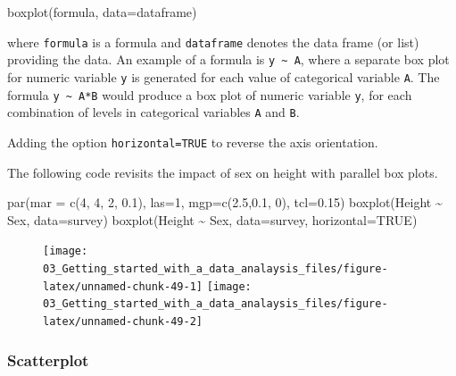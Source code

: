 \documentclass[
]{book}
\newenvironment{Shaded}{\begin{snugshade}}{\end{snugshade}}
\newcommand{\AttributeTok}[1]{\textcolor[rgb]{0.77,0.63,0.00}{#1}}
\newcommand{\ConstantTok}[1]{\textcolor[rgb]{0.00,0.00,0.00}{#1}}
\newcommand{\DecValTok}[1]{\textcolor[rgb]{0.00,0.00,0.81}{#1}}
\newcommand{\FloatTok}[1]{\textcolor[rgb]{0.00,0.00,0.81}{#1}}
\newcommand{\FunctionTok}[1]{\textcolor[rgb]{0.00,0.00,0.00}{#1}}
\newcommand{\NormalTok}[1]{#1}
\newcommand{\SpecialCharTok}[1]{\textcolor[rgb]{0.00,0.00,0.00}{#1}}
\begin{document}
\begin{Shaded}
\begin{Highlighting}[]
\FunctionTok{boxplot}\NormalTok{(formula, }\AttributeTok{data=}\NormalTok{dataframe)}
\end{Highlighting}
\end{Shaded}

where \texttt{formula} is a formula and \texttt{dataframe} denotes the data frame (or list) providing the data. An example of a formula is \texttt{y\ \textasciitilde{}\ A}, where a separate box plot for numeric variable \texttt{y} is generated for each value of categorical variable \texttt{A}. The formula \texttt{y\ \textasciitilde{}\ A*B} would produce a box plot of numeric variable \texttt{y}, for each combination of levels in categorical variables \texttt{A} and \texttt{B}.

Adding the option \texttt{horizontal=TRUE} to reverse the axis orientation.

The following code revisits the impact of sex on height with parallel box plots.

\begin{Shaded}
\begin{Highlighting}[]
\FunctionTok{par}\NormalTok{(}\AttributeTok{mar =} \FunctionTok{c}\NormalTok{(}\DecValTok{4}\NormalTok{, }\DecValTok{4}\NormalTok{, }\DecValTok{2}\NormalTok{, }\FloatTok{0.1}\NormalTok{), }\AttributeTok{las=}\DecValTok{1}\NormalTok{, }\AttributeTok{mgp=}\FunctionTok{c}\NormalTok{(}\FloatTok{2.5}\NormalTok{,}\FloatTok{0.1}\NormalTok{, }\DecValTok{0}\NormalTok{), }\AttributeTok{tcl=}\FloatTok{0.15}\NormalTok{)}
\FunctionTok{boxplot}\NormalTok{(Height }\SpecialCharTok{\textasciitilde{}}\NormalTok{ Sex, }\AttributeTok{data=}\NormalTok{survey)}
\FunctionTok{boxplot}\NormalTok{(Height }\SpecialCharTok{\textasciitilde{}}\NormalTok{ Sex, }\AttributeTok{data=}\NormalTok{survey, }\AttributeTok{horizontal=}\ConstantTok{TRUE}\NormalTok{)}
\end{Highlighting}
\end{Shaded}

\begin{figure}
\texttt{[image: 03\_Getting\_started\_with\_a\_data\_analaysis\_files/figure-latex/unnamed-chunk-49-1]} \texttt{[image: 03\_Getting\_started\_with\_a\_data\_analaysis\_files/figure-latex/unnamed-chunk-49-2]} \end{figure}

\hypertarget{scatterplot}{%
\subsubsection{Scatterplot}\label{scatterplot}}
\end{document}
